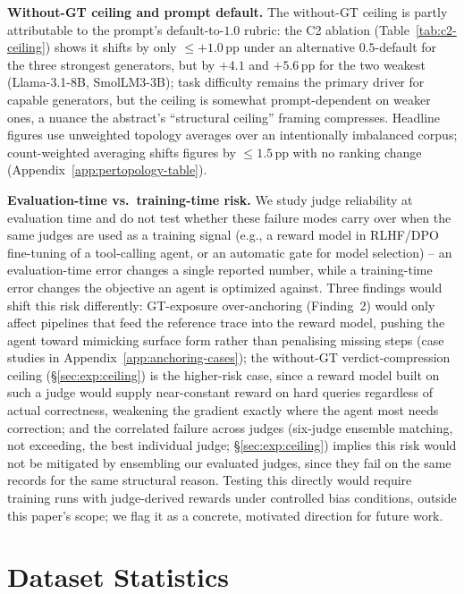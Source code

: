 \textbf{Without-GT ceiling and prompt default.} The without-GT ceiling is partly attributable to the prompt's default-to-$1.0$ rubric: the C2 ablation (Table~\ref{tab:c2-ceiling}) shows it shifts by only ${\leq}{+1.0}$\,pp under an alternative $0.5$-default for the three strongest generators, but by $+4.1$ and $+5.6$\,pp for the two weakest (Llama-3.1-8B, SmolLM3-3B); task difficulty remains the primary driver for capable generators, but the ceiling is somewhat prompt-dependent on weaker ones, a nuance the abstract's ``structural ceiling'' framing compresses. Headline figures use unweighted topology averages over an intentionally imbalanced corpus; count-weighted averaging shifts figures by $\leq1.5$\,pp with no ranking change (Appendix~\ref{app:pertopology-table}).

\textbf{Evaluation-time vs.\ training-time risk.} We study judge reliability at evaluation time and do not test whether these failure modes carry over when the same judges are used as a training signal (e.g., a reward model in RLHF/DPO fine-tuning of a tool-calling agent, or an automatic gate for model selection) -- an evaluation-time error changes a single reported number, while a training-time error changes the objective an agent is optimized against. Three findings would shift this risk differently: GT-exposure over-anchoring (Finding~2) would only affect pipelines that feed the reference trace into the reward model, pushing the agent toward mimicking surface form rather than penalising missing steps (case studies in Appendix~\ref{app:anchoring-cases}); the without-GT verdict-compression ceiling (\S\ref{sec:exp:ceiling}) is the higher-risk case, since a reward model built on such a judge would supply near-constant reward on hard queries regardless of actual correctness, weakening the gradient exactly where the agent most needs correction; and the correlated failure across judges (six-judge ensemble matching, not exceeding, the best individual judge; \S\ref{sec:exp:ceiling}) implies this risk would not be mitigated by ensembling our evaluated judges, since they fail on the same records for the same structural reason. Testing this directly would require training runs with judge-derived rewards under controlled bias conditions, outside this paper's scope; we flag it as a concrete, motivated direction for future work.

\section{Dataset Statistics}
\label{app:dataset-stats}

